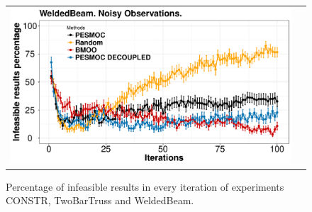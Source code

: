 \documentclass[review,preprint,12pt]{elsarticle}
\begin{document}
\begin{figure}[htb]
\begin{tabular}{cc}
                \includegraphics[width=0.475\linewidth]{../figures/benchmark/WeldedBeam_zeros_noisy} \\
        \end{tabular}
        \caption{Percentage of infeasible results in every iteration of experiments CONSTR, TwoBarTruss and WeldedBeam.}
        \label{fig:benchmark_results_5}
\end{figure}



\end{document}

